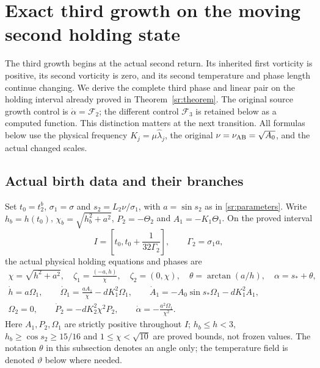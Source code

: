 \section{Exact third growth on the moving second holding state}
\label{tg:section}

The third growth begins at the actual second return. Its inherited
first vorticity is positive, its second vorticity is zero, and its
second temperature and phase length continue changing. We derive the
complete third phase and linear pair on the holding interval already
proved in Theorem~\ref{sr:theorem}. The original source growth control
is $\dot\alpha=\mathcal F_2$; the different control
$\mathcal F_3$ is retained below as a computed function. This distinction
matters at the next transition. All formulas below use the physical
frequency $K_j=\mu\widehat\lambda_j$, the original
$\nu=\nu_{\rm AB}=\sqrt{A_0}$, and the actual changed scales.

\subsection{Actual birth data and their branches}

Set $t_0=t_2^b$, $\sigma_1=\sigma$ and
$s_2=L_2\nu/\sigma_1$, with $a=\sin s_2$ as in
\eqref{sr:parameters}. Write $h_b=h(t_0)$, $\chi_b=\sqrt{h_b^2+a^2}$,
$P_2=-\Theta_2$ and $A_1=-K_1\Theta_1$. On the proved interval
\begin{equation}\label{tg:interval}
 I=\left[t_0,t_0+\frac1{32\Gamma_2}\right],\qquad
 \Gamma_2=\sigma_1a,
\end{equation}
the actual physical holding equations and phases are
\begin{equation}\label{tg:parent}
\begin{gathered}
 \chi=\sqrt{h^2+a^2},\quad
 \zeta_1=\frac{(-a,h)}\chi,\quad \zeta_2=(0,\chi),
 \quad\theta=\arctan(a/h),\quad\alpha=s_*+\theta,\\
 \dot h=a\Omega_1,\qquad
 \dot\Omega_1=\frac{aA_1}{\chi}-dK_1^2\Omega_1,\qquad
 \dot A_1=-A_0\sin s_*\Omega_1-dK_1^2 A_1,\\
 \Omega_2=0,\qquad
 \dot P_2=-dK_2^2\chi^2P_2,\qquad
 \dot\alpha=-\frac{a^2\Omega_1}{\chi^2}.
\end{gathered}
\end{equation}
Here $A_1,P_2,\Omega_1$ are strictly positive throughout $I$;
$h_b\leq h<3$, $h_b\geq\cos s_2\geq15/16$ and
$1\leq\chi<\sqrt{10}$ are proved bounds, not frozen values.
The notation $\theta$ in this subsection denotes an angle only;
the temperature field is denoted $\vartheta$ below where needed.

